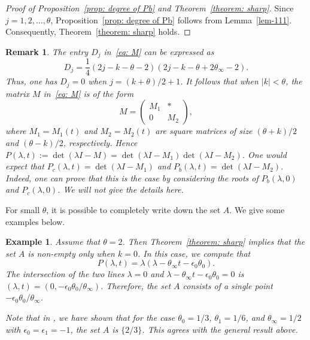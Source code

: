 \documentclass[10pt,a4paper]{amsart}
\numberwithin{equation}{section}
\newtheorem{Example}[Theorem]{Example}
\newtheorem{Remark}[Theorem]{Remark} }
\def\M#1#2#3#4{\begin{pmatrix}#1&#2\\#3&#4\end{pmatrix}}
\begin{document}
\begin{proof}[Proof of Proposition~\ref{prop: degree of Pb} and Theorem~\ref{theorem: sharp}] Since $j=1,2,\dots, \theta$, Proposition~\ref{prop: degree of Pb} follows from Lemma~\ref{lem-111}. Consequently, Theorem~\ref{theorem: sharp} holds.
\end{proof}

\begin{Remark} The entry $D_j$ in~\eqref{eq: M} can be expressed as
\[
 D_j=\frac14(2j-k-\theta-2)(2j-k-\theta+2\theta_\infty-2).
\]
 Thus, one has $D_j=0$ when $j=(k+\theta)/2+1$. It follows that when
 $|k|<\theta$, the matrix $M$ in~\eqref{eq: M} is of the form
\[
M=\M{M_1}*0{M_2},
\]
 where $M_1=M_1(t)$ and $M_2=M_2(t)$ are square matrices of size
 $(\theta+k)/2$ and $(\theta-k)/2$, respectively.
 Hence $P(\lambda,t):=\det(\lambda I-M)=\det(\lambda I-M_1)
 \det(\lambda I-M_2)$. One would expect that
 $P_c(\lambda,t)=\det(\lambda I-M_1)$ and
 $P_b(\lambda,t)=\det(\lambda I-M_2)$. Indeed, one can prove that
 this is the case by considering the roots of $P_b(\lambda,0)$
 and $P_c(\lambda,0)$. We will not give the details here.
\end{Remark}

For small $\theta$, it is possible to completely write down the set
$A$. We give some examples below.

\begin{Example}\label{example1} Assume that $\theta=2$. Then Theorem~\ref{theorem: sharp} implies that the set $A$ is non-empty
 only when $k=0$. In this case, we compute that
\[
 P(\lambda,t)=\lambda(\lambda-\theta_\infty t-\epsilon_0\theta_0).
\]
 The intersection of the two lines $\lambda=0$ and
 $\lambda-\theta_\infty t-\epsilon_0\theta_0=0$ is $(\lambda,t)
 =(0,-\epsilon_0\theta_0/\theta_\infty)$. Therefore, the set $A$
 consists of a single point $-\epsilon_0\theta_0/\theta_\infty$.

 Note that in \cite[Example 5.5]{Chen-Lin-Yang}, we have shown that
 for the case $\theta_0=1/3$, $\theta_1=1/6$, and
 $\theta_\infty=1/2$ with $\epsilon_0=\epsilon_1=-1$, the
 set $A$ is $\{2/3\}$. This agrees with the general result above.
\end{Example}
\end{document}
